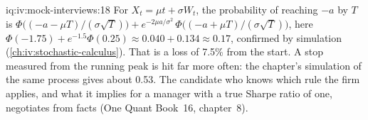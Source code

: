 \begin{solution}{iq:iv:mock-interviews:18}
For $X_t = \mu t + \sigma W_t$, the probability of reaching $-a$ by $T$ is $\Phi\bigl((-a - \mu T)/(\sigma\sqrt T)\bigr) +
e^{-2\mu a/\sigma^2}\,\Phi\bigl((-a + \mu T)/(\sigma\sqrt T)\bigr)$, here $\Phi(-1.75) + e^{-1.5}\Phi(0.25) \approx 0.040 + 0.134
\approx 0.17$, confirmed by simulation (\cref{ch:iv:stochastic-calculus}). That is a loss of 7.5\% from the start. A stop measured
from the running peak is hit far more often: the chapter's simulation of the same process gives about 0.53. The candidate who knows
which rule the firm applies, and what it implies for a manager with a true Sharpe ratio of one, negotiates from facts (One Quant
Book~16, chapter~8).
\end{solution}
